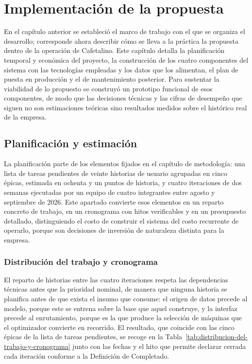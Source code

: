 \section{Implementación de la propuesta}\label{implementacion-de-la-propuesta}

En el capítulo anterior se estableció el marco de trabajo con el que se organiza el desarrollo; corresponde ahora describir cómo se lleva a la práctica la propuesta dentro de la operación de Cafetalino. Este capítulo detalla la planificación temporal y económica del proyecto, la construcción de los cuatro componentes del sistema con las tecnologías empleadas y los datos que los alimentan, el plan de puesta en producción y el de mantenimiento posterior. Para sustentar la viabilidad de lo propuesto se construyó un prototipo funcional de esos componentes, de modo que las decisiones técnicas y las cifras de desempeño que siguen no son estimaciones teóricas sino resultados medidos sobre el histórico real de la empresa.

\subsection{Planificación y estimación}\label{planificacion-y-estimacion}

La planificación parte de los elementos fijados en el capítulo de metodología: una lista de tareas pendientes de veinte historias de usuario agrupadas en cinco épicas, estimada en ochenta y un puntos de historia, y cuatro iteraciones de dos semanas ejecutadas por un equipo de cuatro integrantes entre agosto y septiembre de 2026. Este apartado convierte esos elementos en un reparto concreto de trabajo, en un cronograma con hitos verificables y en un presupuesto detallado, distinguiendo el costo de construir el sistema del costo recurrente de operarlo, porque son decisiones de inversión de naturaleza distinta para la empresa.

\subsubsection{Distribución del trabajo y cronograma}\label{distribucion-del-trabajo-y-cronograma}

El reparto de historias entre las cuatro iteraciones respeta las dependencias técnicas antes que la prioridad nominal, de manera que ninguna historia se planifica antes de que exista el insumo que consume: el origen de datos precede al modelo, porque este se entrena sobre la base que aquel construye, y la interfaz precede al enrutamiento, porque es la que produce la selección de máquinas que el optimizador convierte en recorrido. El resultado, que coincide con las cinco épicas de la lista de tareas pendientes, se recoge en la Tabla~\ref{tab:distribucion-del-trabajo-y-cronograma} junto con las fechas y el hito que permite declarar cerrada cada iteración conforme a la Definición de Completado.

